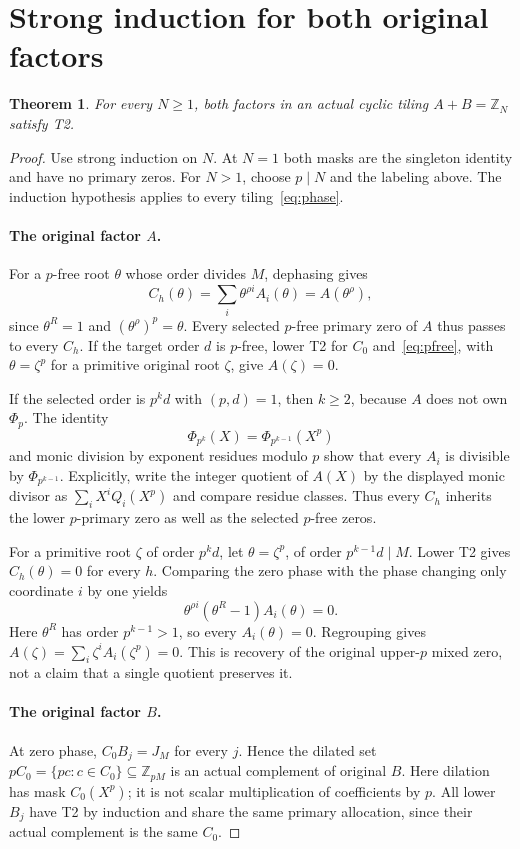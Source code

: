 \documentclass[11pt]{article}
\newtheorem{theorem}{Theorem}
\newcommand{\Z}{\mathbb Z}
\newcommand{\PhiC}{\Phi}
\begin{document}
\section{Strong induction for both original factors}
\begin{theorem}\label{thm:cyclic}
For every $N\ge1$, both factors in an actual cyclic tiling $A+B=\Z_N$ satisfy T2.
\end{theorem}
\begin{proof}
Use strong induction on $N$. At $N=1$ both masks are the singleton identity and have no primary zeros. For $N>1$, choose $p\mid N$ and the labeling above. The induction hypothesis applies to every tiling~\eqref{eq:phase}.

\paragraph{The original factor $A$.}
For a $p$-free root $\theta$ whose order divides $M$, dephasing gives
\begin{equation}\label{eq:pfree}
 C_h(\theta)=\sum_i\theta^{\rho i}A_i(\theta)=A(\theta^\rho),
\end{equation}
since $\theta^R=1$ and $(\theta^\rho)^p=\theta$. Every selected $p$-free primary zero of $A$ thus passes to every $C_h$. If the target order $d$ is $p$-free, lower T2 for $C_0$ and~\eqref{eq:pfree}, with $\theta=\zeta^p$ for a primitive original root $\zeta$, give $A(\zeta)=0$.

If the selected order is $p^kd$ with $(p,d)=1$, then $k\ge2$, because $A$ does not own $\PhiC_p$. The identity
\[
 \PhiC_{p^k}(X)=\PhiC_{p^{k-1}}(X^p)
\]
and monic division by exponent residues modulo $p$ show that every $A_i$ is divisible by $\PhiC_{p^{k-1}}$. Explicitly, write the integer quotient of $A(X)$ by the displayed monic divisor as $\sum_iX^iQ_i(X^p)$ and compare residue classes. Thus every $C_h$ inherits the lower $p$-primary zero as well as the selected $p$-free zeros.

For a primitive root $\zeta$ of order $p^kd$, let $\theta=\zeta^p$, of order $p^{k-1}d\mid M$. Lower T2 gives $C_h(\theta)=0$ for every $h$. Comparing the zero phase with the phase changing only coordinate $i$ by one yields
\[
 \theta^{\rho i}(\theta^R-1)A_i(\theta)=0.
\]
Here $\theta^R$ has order $p^{k-1}>1$, so every $A_i(\theta)=0$. Regrouping gives $A(\zeta)=\sum_i\zeta^i A_i(\zeta^p)=0$. This is recovery of the original upper-$p$ mixed zero, not a claim that a single quotient preserves it.

\paragraph{The original factor $B$.}
At zero phase, $C_0B_j=J_M$ for every $j$. Hence the dilated set $pC_0=\{pc:c\in C_0\}\subseteq\Z_{pM}$ is an actual complement of original $B$. Here dilation has mask $C_0(X^p)$; it is not scalar multiplication of coefficients by $p$. All lower $B_j$ have T2 by induction and share the same primary allocation, since their actual complement is the same $C_0$.


\end{proof}
\end{document}
